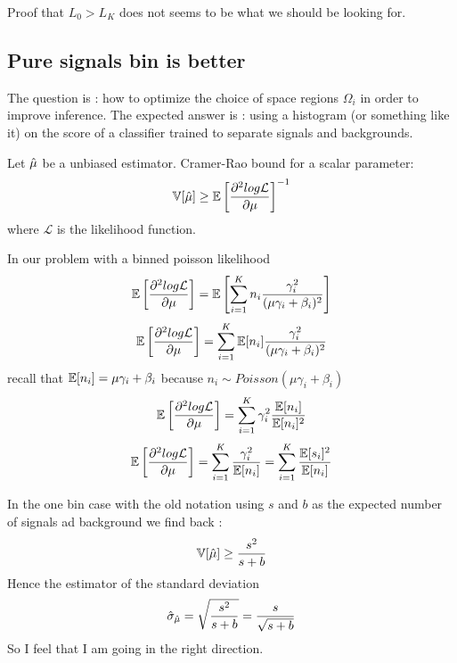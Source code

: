 Proof that $L_0 > L_K$ does not seems to be what we should be looking for.





\subsection{Pure signals bin is better}


The question is : how to optimize the choice of space regions $\Omega_i$ in order to improve inference.
The expected answer is : using a histogram (or something like it) on the score of a classifier trained to separate signals and backgrounds.


Let $\hat\mu$ be a unbiased estimator.
Cramer-Rao bound for a scalar parameter:
\begin{equation}
    \mathbb{V}[\hat\mu] \geq \mathbb{E} \left [ \frac{\partial^2 log \mathcal L}{\partial \mu}  \right ]^{-1}
\end{equation}
where $\mathcal L$ is the likelihood function.

In our problem with a binned poisson likelihood
\begin{equation}
    \mathbb{E} \left [ \frac{\partial^2 log \mathcal L}{\partial \mu}  \right ] = \mathbb{E} \left[ \sum_{i=1}^K n_i \frac{\gamma_i^2}{(\mu \gamma_i + \beta_i)^2}  \right ]
\end{equation}
\begin{equation}
    \mathbb{E} \left [ \frac{\partial^2 log \mathcal L}{\partial \mu}  \right ] = \sum_{i=1}^K \mathbb{E}[n_i] \frac{\gamma_i^2}{(\mu \gamma_i + \beta_i)^2}
\end{equation}
recall that $\mathbb{E}[n_i] = \mu \gamma_i + \beta_i$ because $n_i \sim Poisson(\mu \gamma_i + \beta_i)$ 
\begin{equation}
    \mathbb{E} \left [ \frac{\partial^2 log \mathcal L}{\partial \mu}  \right ] = \sum_{i=1}^K  \gamma_i^2 \frac{\mathbb{E}[n_i]}{\mathbb{E}[n_i]^2}
\end{equation}
\begin{equation}
    \mathbb{E} \left [ \frac{\partial^2 log \mathcal L}{\partial \mu}  \right ] = \sum_{i=1}^K  \frac{\gamma_i^2}{\mathbb{E}[n_i]} = \sum_{i=1}^K  \frac{\mathbb{E}[s_i]^2}{\mathbb{E}[n_i]}
\end{equation}

In the one bin case with the old notation using $s$ and $b$ as the expected number of signals ad background we find back :
\begin{equation}
    \mathbb{V}[\hat\mu] \geq \frac{s^2}{s+b} 
\end{equation}
Hence the estimator of the standard deviation 
\begin{equation}
    \hat\sigma_{\hat\mu} = \sqrt{\frac{s^2}{s+b}} = \frac{s}{\sqrt{s+b}} 
\end{equation}
So I feel that I am going in the right direction.

